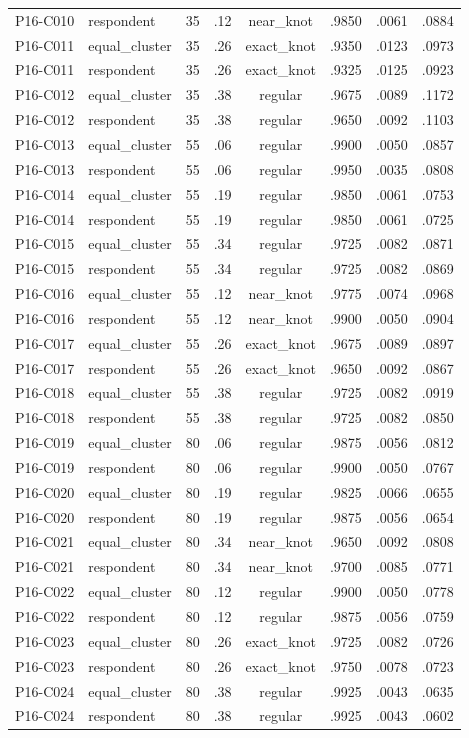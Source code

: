 {\begin{longtable}{llrrcrrr}
P16-C010 & respondent & 35 & .12 & near\_knot & .9850 & .0061 & .0884 \\
P16-C011 & equal\_cluster & 35 & .26 & exact\_knot & .9350 & .0123 & .0973 \\
P16-C011 & respondent & 35 & .26 & exact\_knot & .9325 & .0125 & .0923 \\
P16-C012 & equal\_cluster & 35 & .38 & regular & .9675 & .0089 & .1172 \\
P16-C012 & respondent & 35 & .38 & regular & .9650 & .0092 & .1103 \\
P16-C013 & equal\_cluster & 55 & .06 & regular & .9900 & .0050 & .0857 \\
P16-C013 & respondent & 55 & .06 & regular & .9950 & .0035 & .0808 \\
P16-C014 & equal\_cluster & 55 & .19 & regular & .9850 & .0061 & .0753 \\
P16-C014 & respondent & 55 & .19 & regular & .9850 & .0061 & .0725 \\
P16-C015 & equal\_cluster & 55 & .34 & regular & .9725 & .0082 & .0871 \\
P16-C015 & respondent & 55 & .34 & regular & .9725 & .0082 & .0869 \\
P16-C016 & equal\_cluster & 55 & .12 & near\_knot & .9775 & .0074 & .0968 \\
P16-C016 & respondent & 55 & .12 & near\_knot & .9900 & .0050 & .0904 \\
P16-C017 & equal\_cluster & 55 & .26 & exact\_knot & .9675 & .0089 & .0897 \\
P16-C017 & respondent & 55 & .26 & exact\_knot & .9650 & .0092 & .0867 \\
P16-C018 & equal\_cluster & 55 & .38 & regular & .9725 & .0082 & .0919 \\
P16-C018 & respondent & 55 & .38 & regular & .9725 & .0082 & .0850 \\
P16-C019 & equal\_cluster & 80 & .06 & regular & .9875 & .0056 & .0812 \\
P16-C019 & respondent & 80 & .06 & regular & .9900 & .0050 & .0767 \\
P16-C020 & equal\_cluster & 80 & .19 & regular & .9825 & .0066 & .0655 \\
P16-C020 & respondent & 80 & .19 & regular & .9875 & .0056 & .0654 \\
P16-C021 & equal\_cluster & 80 & .34 & near\_knot & .9650 & .0092 & .0808 \\
P16-C021 & respondent & 80 & .34 & near\_knot & .9700 & .0085 & .0771 \\
P16-C022 & equal\_cluster & 80 & .12 & regular & .9900 & .0050 & .0778 \\
P16-C022 & respondent & 80 & .12 & regular & .9875 & .0056 & .0759 \\
P16-C023 & equal\_cluster & 80 & .26 & exact\_knot & .9725 & .0082 & .0726 \\
P16-C023 & respondent & 80 & .26 & exact\_knot & .9750 & .0078 & .0723 \\
P16-C024 & equal\_cluster & 80 & .38 & regular & .9925 & .0043 & .0635 \\
P16-C024 & respondent & 80 & .38 & regular & .9925 & .0043 & .0602 \\
\bottomrule
\end{longtable}
}
